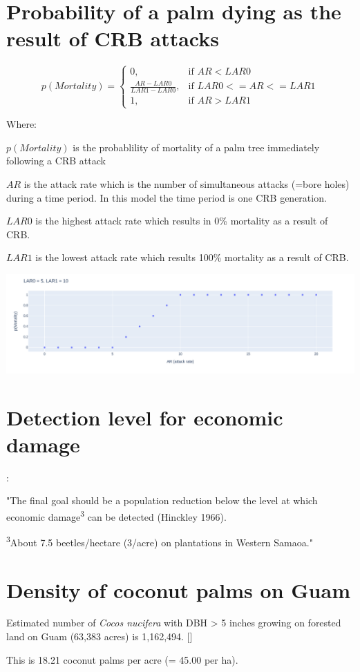 \documentclass[12pt,letterpaper,english,bibliography=totocnumbered, abstract=on]{scrartcl}
\begin{document}
\section{Probability of a palm dying as the result of CRB attacks}

$$
p(Mortality)=
\begin{cases}
0, & \text{if $AR < LAR0$} \\
\frac{AR-LAR0}{LAR1-LAR0}, & \text{if $LAR0 <= AR <= LAR1$} \\
1, & \text{if $AR > LAR1$}
\end{cases}
$$

Where:

$p(Mortality)$ is the probablility of mortality of a palm tree immediately following a CRB attack
	
$AR$ is the attack rate which is the number of simultaneous attacks (=bore holes) during a time period. In this model the time period is one CRB generation.

$LAR0$ is the highest attack rate which results in 0\% mortality as a result of CRB.

$LAR1$ is the lowest attack rate which results 100\% mortality as a result of CRB.

\begin{center}
	\includegraphics[width=\linewidth]{../images/pmort}
\end{center}


\section{Detection level for economic damage}

\cite{hinckley_ecology_1973}:

"The final goal should be a population reduction below the level at which economic damage\textsuperscript{3} can be detected (Hinckley 1966).

\textsuperscript{3}About 7.5 beetles/hectare (3/acre) on plantations in Western Samaoa."

\section{Density of coconut palms on Guam}

Estimated number of \textit{Cocos nucifera} with DBH > 5 inches growing on forested land on Guam (63,383 acres) is 1,162,494. [\cite{donnegon_guams_2004}] 

This is 18.21 coconut palms per acre (=	45.00 per ha).

\newpage
\printbibliography
\end{document}
